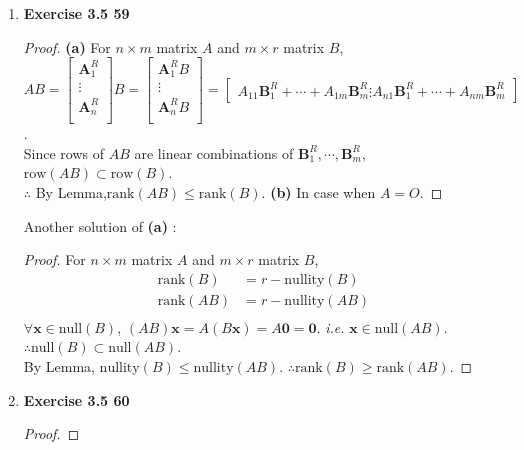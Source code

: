 \begin{enumerate}
\begin{proof}
		By F.T.I.M, $ \exists \inv{A}$ and $ \exists \inv{B}$. Therefore, $ \inv{AB}=\inv{B}\inv{A} $. By F.T.I.M, rank($ AB $) $ =n $.
	\end{proof}
	\item \textbf{Exercise 3.5 59}
	\begin{proof}
		\noindent \textbf{(a)} For $ n\times m $ matrix $ A $ and $ m\times r $ matrix $ B $,\\ $ AB = \begin{bmatrix}
		\textbf{A}^R_1 \\
		\vdots \\
		\textbf{A}^R_n \\
		\end{bmatrix}B = \begin{bmatrix}
		\textbf{A}^R_1 B \\
		\vdots \\
		\textbf{A}^R_n B \\
		\end{bmatrix} = \begin{bmatrix}
		A_{11}\textbf{B}^R_1 + \cdots + A_{1m}\textbf{B}^R_m
		\vdots
		A_{n1}\textbf{B}^R_1 + \cdots + A_{nm}\textbf{B}^R_m
		\end{bmatrix}$. \\
		Since rows of $ AB $ are linear combinations of $ \textbf{B}^R_1, \cdots , \textbf{B}^R_m $, $ \text{row}(AB) \subset \text{row}(B) $. \\
		$ \therefore $ By Lemma,$ \text{rank}(AB) \leq \text{rank}(B) $.
		\noindent \textbf{(b)} In case when $ A=O $.
	\end{proof}
	Another solution of \textbf{(a)} : 
	\begin{proof}
		For $ n\times m $ matrix $ A $ and $ m\times r $ matrix $ B $,
		\begin{align*}
		\text{rank}(B) &= r - \text{nullity}(B) \\
		\text{rank}(AB) &= r - \text{nullity}(AB) \\
		\end{align*}
		$ \forall \textbf{x}\in \text{null}(B) $, $ (AB)\textbf{x}=A(B\textbf{x})=A\textbf{0}=\textbf{0} $. \textit{i.e.} $ \textbf{x}\in \text{null}(AB) $. $ \therefore \text{null}(B) \subset \text{null}(AB) $. \\
		By Lemma, $ \text{nullity}(B)\leq \text{nullity}(AB)$. $ \therefore \text{rank}(B) \geq \text{rank}(AB) $.
	\end{proof}
	\item \textbf{Exercise 3.5 60}
	\begin{proof}

\end{proof}
\end{enumerate}
